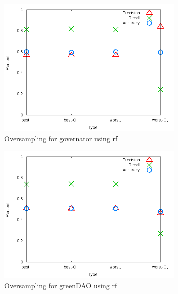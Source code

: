 \begin{figure}[!t]
\centering
\includegraphics[width=0.8\textwidth]{images/rf/test_4/governator_sample_range.png}
\caption{Oversampling for governator using \gls{rf}}
\label{fig:test_4_governator_rf}
\end{figure}

\begin{figure}[!t]
\centering
\includegraphics[width=0.8\textwidth]{images/rf/test_4/greenDAO_sample_range.png}
\caption{Oversampling for greenDAO using \gls{rf}}
\label{fig:test_4_greenDAO_rf}
\end{figure}

